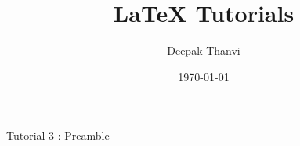 \documentclass{article}
\title{LaTeX Tutorials}
\author{Deepak Thanvi}
\date{\today}
\begin{document}
\maketitle

Tutorial 3 : Preamble
\end{document}
